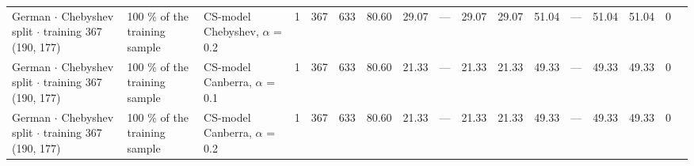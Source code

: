 \begin{longtable}{lllrrrrrrrrrrrrrl}
  German $\cdot$ Chebyshev split $\cdot$ training 367 (190, 177) & 100 \% of the training sample & CS-model Chebyshev, $\alpha$ = 0.2 & 1 & 367 & 633 & 80.60 & 29.07 & --- & 29.07 & 29.07 & 51.04 & --- & 51.04 & 51.04 & 0 &  \\
  German $\cdot$ Chebyshev split $\cdot$ training 367 (190, 177) & 100 \% of the training sample & CS-model Canberra, $\alpha$ = 0.1 & 1 & 367 & 633 & 80.60 & 21.33 & --- & 21.33 & 21.33 & 49.33 & --- & 49.33 & 49.33 & 0 &  \\
  German $\cdot$ Chebyshev split $\cdot$ training 367 (190, 177) & 100 \% of the training sample & CS-model Canberra, $\alpha$ = 0.2 & 1 & 367 & 633 & 80.60 & 21.33 & --- & 21.33 & 21.33 & 49.33 & --- & 49.33 & 49.33 & 0 &  \\
\end{longtable}
